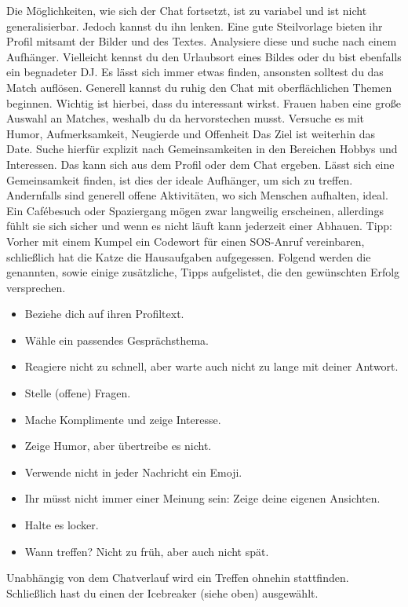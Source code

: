 Die Möglichkeiten, wie sich der Chat fortsetzt, ist zu variabel und ist nicht generalisierbar.
Jedoch kannst du ihn lenken.
Eine gute Steilvorlage bieten ihr Profil mitsamt der Bilder und des Textes.
Analysiere diese und suche nach einem Aufhänger.
Vielleicht kennst du den Urlaubsort eines Bildes oder du bist ebenfalls ein begnadeter DJ. 
Es lässt sich immer etwas finden, ansonsten solltest du das Match auflösen. 
Generell kannst du ruhig den Chat mit oberflächlichen Themen beginnen.
Wichtig ist hierbei, dass du interessant wirkst.
Frauen haben eine große Auswahl an Matches, weshalb du da hervorstechen musst.
Versuche es mit Humor, Aufmerksamkeit, Neugierde und Offenheit
Das Ziel ist weiterhin das Date.
Suche hierfür explizit nach Gemeinsamkeiten in den Bereichen Hobbys und Interessen.
Das kann sich aus dem Profil oder dem Chat ergeben.
Lässt sich eine Gemeinsamkeit finden, ist dies der ideale Aufhänger, um sich zu treffen.
Andernfalls sind generell offene Aktivitäten, wo sich Menschen aufhalten, ideal.
Ein Cafébesuch oder Spaziergang mögen zwar langweilig erscheinen, allerdings fühlt sie sich sicher und wenn es nicht läuft kann jederzeit einer Abhauen.
Tipp: Vorher mit einem Kumpel ein Codewort für einen SOS-Anruf vereinbaren, schließlich hat die Katze die Hausaufgaben aufgegessen.
Folgend werden die genannten, sowie einige zusätzliche, Tipps aufgelistet, die den gewünschten Erfolg versprechen.

\begin{itemize}
    \item Beziehe dich auf ihren Profiltext.
    \item Wähle ein passendes Gesprächsthema.
    \item Reagiere nicht zu schnell, aber warte auch nicht zu lange mit deiner Antwort.
    \item Stelle (offene) Fragen.
    \item Mache Komplimente und zeige Interesse.
    \item Zeige Humor, aber übertreibe es nicht.
    \item Verwende nicht in jeder Nachricht ein Emoji.
    \item Ihr müsst nicht immer einer Meinung sein: Zeige deine eigenen Ansichten.
    \item Halte es locker.
    \item Wann treffen? Nicht zu früh, aber auch nicht spät.
\end{itemize}

Unabhängig von dem Chatverlauf wird ein Treffen ohnehin stattfinden.
Schließlich hast du einen der Icebreaker (siehe oben) ausgewählt. 


